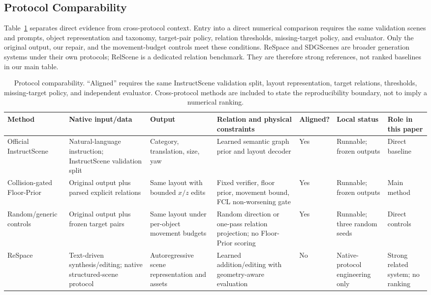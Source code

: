 \documentclass{egpubl}
\newcommand{\fp}{Floor-Prior}
\begin{document}
\subsection{Protocol Comparability}

Table~\ref{tab:protocol} separates direct evidence from cross-protocol context. Entry into a direct numerical comparison requires the same validation scenes and prompts, object representation and taxonomy, target-pair policy, relation thresholds, missing-target policy, and evaluator. Only the original output, our repair, and the movement-budget controls meet these conditions. ReSpace and SDGScenes are broader generation systems under their own protocols; RelScene is a dedicated relation benchmark. They are therefore strong references, not ranked baselines in our main table.

\begin{table}[t]
\centering
\scriptsize
\caption{Protocol comparability. ``Aligned'' requires the same InstructScene validation split, layout representation, target relations, thresholds, missing-target policy, and independent evaluator. Cross-protocol methods are included to state the reproducibility boundary, not to imply a numerical ranking.}
\label{tab:protocol}
\begin{tabularx}{\textwidth}{p{2.05cm}X p{2.25cm}p{2.9cm}p{1.1cm}p{2.15cm}X}
\toprule
Method & Native input/data & Output & Relation and physical constraints & Aligned? & Local status & Role in this paper \\
\midrule
Official InstructScene~\cite{lin2024instructscene} & Natural-language instruction; InstructScene validation split & Category, translation, size, yaw & Learned semantic graph prior and layout decoder & Yes & Runnable; frozen outputs & Direct baseline \\
Collision-gated \fp{} & Original output plus parsed explicit relations & Same layout with bounded $x/z$ edits & Fixed verifier, floor prior, movement bound, FCL non-worsening gate & Yes & Runnable; frozen outputs & Main method \\
Random/generic controls & Original output plus frozen target pairs & Same layout under per-object movement budgets & Random direction or one-pass relation projection; no \fp{} scoring & Yes & Runnable; three random seeds & Direct controls \\
ReSpace~\cite{bucher2026respace} & Text-driven synthesis/editing; native structured-scene protocol & Autoregressive scene representation and assets & Learned addition/editing with geometry-aware evaluation & No & Native-protocol engineering only & Strong related system; no ranking \\

\end{tabularx}
\end{table}
\end{document}
